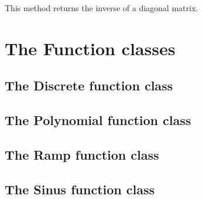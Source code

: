 This method returns the inverse of a diagonal matrix.

\section{The Function classes}

\subsection{The Discrete function class}

\subsection{The Polynomial function class}

\subsection{The Ramp function class}

\subsection{The Sinus function class}
